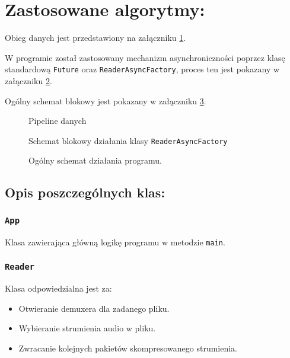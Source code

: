 \documentclass[a4paper,12pt]{article}
\begin{document}
\section{Zastosowane algorytmy:}

Obieg danych jest przedstawiony na załączniku \ref{rys:pipeline}.

W programie został zastosowany mechanizm asynchroniczności poprzez klasę
standardową \texttt{Future} oraz \texttt{ReaderAsyncFactory}, proces ten jest
pokazany w załączniku \ref{rys:reader}. 

Ogólny schemat blokowy jest pokazany w załączniku \ref{rys:program}.

\begin{figure}[p]
    \resizebox{.3\textwidth}{!}{%
    }
    \centering
    \caption{Pipeline danych}
    \label{rys:pipeline}
\end{figure}

\begin{figure}[t]
    \resizebox{.5\textwidth}{!}{%
    }
    \centering
    \caption{Schemat blokowy działania klasy \texttt{ReaderAsyncFactory}}
    \label{rys:reader}
\end{figure}

\begin{figure}[p]
    \resizebox{.54\textwidth}{!}{%
    }
    \centering
    \caption{Ogólny schemat działania programu.}
    \label{rys:program}
\end{figure}

\subsection*{Opis poszczególnych klas:}

\subsubsection{\texttt{App}}

Klasa zawierająca główną logikę programu w metodzie \texttt{main}.

\subsubsection{\texttt{Reader}}

Klasa odpowiedzialna jest za: 
\begin{itemize}
    \item Otwieranie demuxera dla zadanego pliku. 
    \item Wybieranie strumienia audio w pliku.
    \item Zwracanie kolejnych pakietów skompresowanego strumienia.
\end{itemize}
\end{document}
